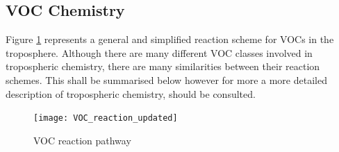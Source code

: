 \subsection{VOC Chemistry}
Figure \ref{f:VOC_reaction} represents a general and simplified reaction scheme for VOCs in the troposphere. Although there are
many different VOC classes involved in tropospheric chemistry, there are many similarities between their reaction schemes. This
shall be summarised below however for more a more detailed description of tropospheric chemistry, \citep{Atkinson:2000} should 
be consulted. 
\begin{figure}[ht] 
    \begin{center}
        \texttt{[image: VOC\_reaction\_updated]}
        \caption[what is this]{VOC reaction pathway}
        \label{f:VOC_reaction}
    \end{center}
\end{figure}

